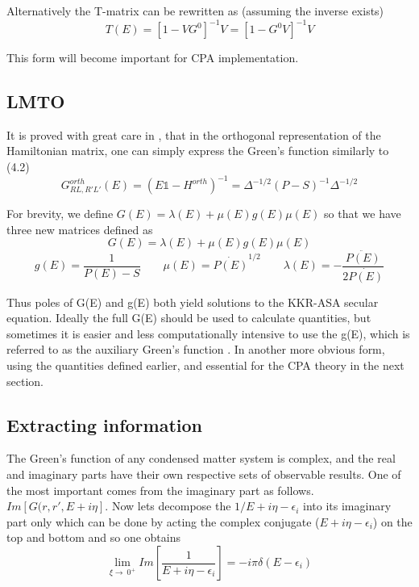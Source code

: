 \documentclass[12pt]{article}
\begin{document}
Alternatively the T-matrix can be rewritten as (assuming the inverse exists) 
\begin{equation} \label{4.1} \tag{4.8}
T(E)=[1-VG^0]^{-1}V=[1-G^0V]^{-1}V
\end{equation}

This form will become important for CPA implementation.

\subsection{LMTO}

It is proved with great care in \cite{turek}, that in the orthogonal representation of the Hamiltonian matrix, one can simply express the Green's function similarly to (4.2)
\begin{equation} \label{4.1} \tag{4.9}
G^{orth}_{RL,R'L'}(E)=(E\mathbb{1}-H^{orth})^{-1}=\Delta^{-1/2}(P-S)^{-1}\Delta^{-1/2}
\end{equation}


For brevity, we define $G(E)= \lambda(E) +\mu(E)g(E)\mu(E)$ so that we have three new matrices defined as\cite{drchal}
\begin{equation} \label{4.1} \tag{4.10}
G(E)= \lambda(E) +\mu(E)g(E)\mu(E)
\end{equation}
\begin{equation} \label{4.1} \tag{4.11}
g(E)=\frac{1}{P(E)-S} \qquad \mu(E)= \dot{P(E)}^{1/2} \qquad \lambda(E)=- \frac{\ddot{P(E)}}{2\dot{P(E)}}
\end{equation}

Thus poles of G(E) and g(E) both yield solutions to the KKR-ASA secular equation. Ideally the full G(E) should be used to calculate quantities, but sometimes it is easier and less computationally intensive to use the g(E), which is referred to as the auxiliary Green's function \cite{andersen}. In another more obvious form, using the quantities defined earlier, and essential for the CPA theory in the next section.

\subsection{Extracting information}

The Green's function of any condensed matter system is complex, and the real and imaginary parts have their own respective sets of observable results. One of the most important comes from the imaginary part as follows. 
$Im[G(r,r',E+i\eta]$. Now lets decompose the $1/E+i\eta-\epsilon_i$ into its imaginary part only which can be done by acting the complex conjugate ($E+i\eta-\epsilon_i$) on the top and bottom and so one obtains 
\begin{equation} \label{4.1} \tag{4.12}
\lim_{\xi\to\ 0^+}Im[\frac{1}{E+i\eta-\epsilon_i}]=-i\pi \delta(E-\epsilon_i)
\end{equation}
\end{document}
